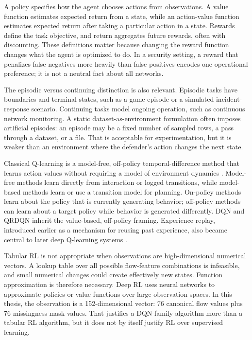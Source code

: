 A policy specifies how the agent chooses actions from observations. A value function estimates expected return from a state, while an action-value function estimates expected return after taking a particular action in a state. Rewards define the task objective, and return aggregates future rewards, often with discounting. These definitions matter because changing the reward function changes what the agent is optimized to do. In a security setting, a reward that penalizes false negatives more heavily than false positives encodes one operational preference; it is not a neutral fact about all networks.

The episodic versus continuing distinction is also relevant. Episodic tasks have boundaries and terminal states, such as a game episode or a simulated incident-response scenario. Continuing tasks model ongoing operation, such as continuous network monitoring. A static dataset-as-environment formulation often imposes artificial episodes: an episode may be a fixed number of sampled rows, a pass through a dataset, or a file. That is acceptable for experimentation, but it is weaker than an environment where the defender's action changes the next state.

Classical Q-learning is a model-free, off-policy temporal-difference method that learns action values without requiring a model of environment dynamics \parencite{WatkinsDayan1992QLearning}. Model-free methods learn directly from interaction or logged transitions, while model-based methods learn or use a transition model for planning. On-policy methods learn about the policy that is currently generating behavior; off-policy methods can learn about a target policy while behavior is generated differently. DQN and QRDQN inherit the value-based, off-policy framing. Experience replay, introduced earlier as a mechanism for reusing past experience, also became central to later deep Q-learning systems \parencite{Lin1992ReactiveAgents}.

Tabular RL is not appropriate when observations are high-dimensional numerical vectors. A lookup table over all possible flow-feature combinations is infeasible, and small numerical changes could create effectively new states. Function approximation is therefore necessary. Deep RL uses neural networks to approximate policies or value functions over large observation spaces. In this thesis, the observation is a 152-dimensional vector: 76 canonical flow values plus 76 missingness-mask values. That justifies a DQN-family algorithm more than a tabular RL algorithm, but it does not by itself justify RL over supervised learning.

